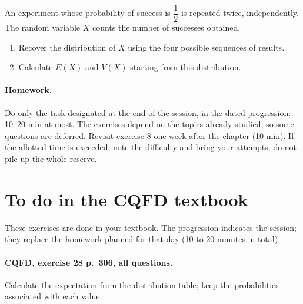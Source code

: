 An experiment whose probability of success is $\dfrac12$ is repeated twice, independently. The random variable $X$ counts the number of successes obtained.
\begin{enumerate}[label=\arabic*.]
\item Recover the distribution of $X$ using the four possible sequences of results.
\item Calculate $E(X)$ and $V(X)$ starting from this distribution.
\end{enumerate}
\paragraph{Homework.} Do only the task designated at the end of the session, in the dated progression: 10--20 min at most. The exercises depend on the topics already studied, so some questions are deferred. Revisit exercise 8 one week after the chapter (10 min). If the allotted time is exceeded, note the difficulty and bring your attempts; do not pile up the whole reserve.
\endgroup
{}\section*{To do in the CQFD textbook}
These exercises are done in your textbook. The progression indicates the session; they replace the homework planned for that day (10 to 20 minutes in total).
\paragraph{CQFD, exercise 28 p.~306, all questions.}\label{C08-M1} Calculate the expectation from the distribution table; keep the probabilities associated with each value.
